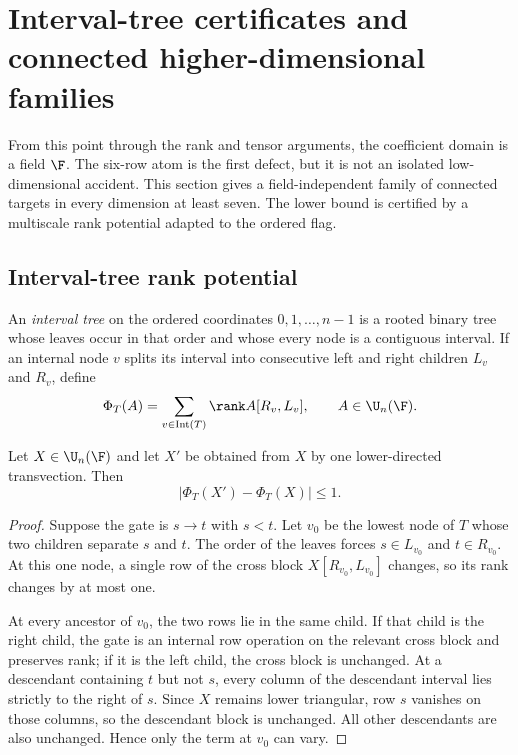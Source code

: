 \section{Interval-tree certificates and connected higher-dimensional families}\label{sec:higher}

From this point through the rank and tensor arguments, the coefficient domain is a field $\F$.  The six-row atom is the first defect, but it is not an isolated low-dimensional accident.  This section gives a field-independent family of connected targets in every dimension at least seven.  The lower bound is certified by a multiscale rank potential adapted to the ordered flag.

\subsection{Interval-tree rank potential}

\begin{definition}
An \emph{interval tree} on the ordered coordinates $0,1,\ldots,n-1$ is a rooted binary tree whose leaves occur in that order and whose every node is a contiguous interval.  If an internal node $v$ splits its interval into consecutive left and right children $L_v$ and $R_v$, define
\begin{equation}\label{eq:tree-potential}
\Phi_T(A)
=
\sum_{v\in\operatorname{Int}(T)}
\rank A[R_v,L_v],
\qquad A\in\U_n(\F).
\end{equation}
\end{definition}

\begin{lemma}\label{lem:one-cut-locality}
Let $X\in\U_n(\F)$ and let $X'$ be obtained from $X$ by one lower-directed transvection.  Then
\[
\bigl|\Phi_T(X')-\Phi_T(X)\bigr|\le1.
\]
\end{lemma}

\begin{proof}
Suppose the gate is $s\to t$ with $s<t$.  Let $v_0$ be the lowest node of $T$ whose two children separate $s$ and $t$.  The order of the leaves forces $s\in L_{v_0}$ and $t\in R_{v_0}$.  At this one node, a single row of the cross block $X[R_{v_0},L_{v_0}]$ changes, so its rank changes by at most one.

At every ancestor of $v_0$, the two rows lie in the same child.  If that child is the right child, the gate is an internal row operation on the relevant cross block and preserves rank; if it is the left child, the cross block is unchanged.  At a descendant containing $t$ but not $s$, every column of the descendant interval lies strictly to the right of $s$.  Since $X$ remains lower triangular, row $s$ vanishes on those columns, so the descendant block is unchanged.  All other descendants are also unchanged.  Hence only the term at $v_0$ can vary.
\end{proof}


